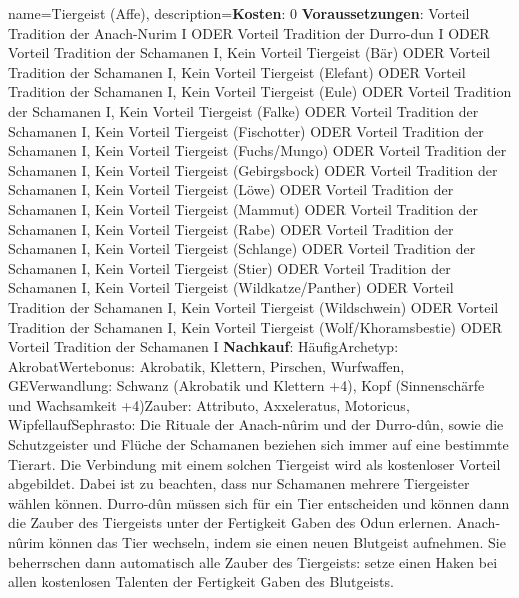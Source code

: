 {
    name={Tiergeist (Affe)},
    description={\textbf{Kosten}: 0 \textbf{Voraussetzungen}: Vorteil Tradition der Anach-Nurim I ODER Vorteil Tradition der Durro-dun I ODER Vorteil Tradition der Schamanen I, Kein Vorteil Tiergeist (Bär) ODER Vorteil Tradition der Schamanen I, Kein Vorteil Tiergeist (Elefant) ODER Vorteil Tradition der Schamanen I, Kein Vorteil Tiergeist (Eule) ODER Vorteil Tradition der Schamanen I, Kein Vorteil Tiergeist (Falke) ODER Vorteil Tradition der Schamanen I, Kein Vorteil Tiergeist (Fischotter) ODER Vorteil Tradition der Schamanen I, Kein Vorteil Tiergeist (Fuchs/Mungo) ODER Vorteil Tradition der Schamanen I, Kein Vorteil Tiergeist (Gebirgsbock) ODER Vorteil Tradition der Schamanen I, Kein Vorteil Tiergeist (Löwe) ODER Vorteil Tradition der Schamanen I, Kein Vorteil Tiergeist (Mammut) ODER Vorteil Tradition der Schamanen I, Kein Vorteil Tiergeist (Rabe) ODER Vorteil Tradition der Schamanen I, Kein Vorteil Tiergeist (Schlange) ODER Vorteil Tradition der Schamanen I, Kein Vorteil Tiergeist (Stier) ODER Vorteil Tradition der Schamanen I, Kein Vorteil Tiergeist (Wildkatze/Panther) ODER Vorteil Tradition der Schamanen I, Kein Vorteil Tiergeist (Wildschwein) ODER Vorteil Tradition der Schamanen I, Kein Vorteil Tiergeist (Wolf/Khoramsbestie) ODER Vorteil Tradition der Schamanen I \textbf{Nachkauf}: Häufig\newline Archetyp: Akrobat\newline Wertebonus: Akrobatik, Klettern, Pirschen, Wurfwaffen, GE\newline Verwandlung: Schwanz (Akrobatik und Klettern +4), Kopf (Sinnenschärfe und Wachsamkeit +4)\newline Zauber: Attributo, Axxeleratus, Motoricus, Wipfellauf\newline Sephrasto: Die Rituale der Anach-nûrim und der Durro-dûn, sowie die Schutzgeister und Flüche der Schamanen beziehen sich immer auf eine bestimmte Tierart. Die Verbindung mit einem solchen Tiergeist wird als kostenloser Vorteil abgebildet. Dabei ist zu beachten, dass nur Schamanen mehrere Tiergeister wählen können. Durro-dûn müssen sich für ein Tier entscheiden und können dann die Zauber des Tiergeists unter der Fertigkeit Gaben des Odun erlernen. Anach-nûrim können das Tier wechseln, indem sie einen neuen Blutgeist aufnehmen. Sie beherrschen dann automatisch alle Zauber des Tiergeists: setze einen Haken bei allen kostenlosen Talenten der Fertigkeit Gaben des Blutgeists.}
}


